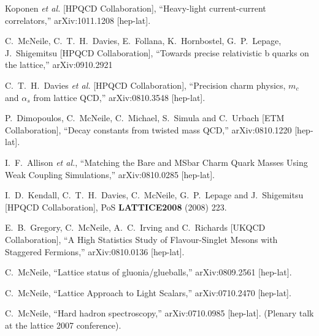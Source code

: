 \begin{thebibliography}{130}
   Koponen {\it et al.}  [HPQCD Collaboration],
  ``Heavy-light current-current correlators,''
  arXiv:1011.1208 [hep-lat].


  C.~McNeile, C.~T.~H.~Davies, E.~Follana, K.~Hornbostel,
  G.~P.~Lepage, J.~Shigemitsu [HPQCD Collaboration],
  ``Towards precise relativistic b quarks on the lattice,''
  arXiv:0910.2921

  C.~T.~H.~Davies {\it et al.}  [HPQCD Collaboration],
  ``Precision charm physics, $m_c$ and $\alpha_s$ from lattice QCD,''
  arXiv:0810.3548 [hep-lat].


  P.~Dimopoulos, C.~McNeile, C.~Michael, S.~Simula and C.~Urbach  [ETM
                  Collaboration],
  ``Decay constants from twisted mass QCD,''
  arXiv:0810.1220 [hep-lat].



  I.~F.~Allison {\it et al.},
  ``Matching the Bare and MSbar Charm Quark Masses Using Weak
  Coupling
  Simulations,''
  arXiv:0810.0285 [hep-lat].

  I.~D.~Kendall, C.~T.~H.~Davies, C.~McNeile, G.~P.~Lepage and
  J.~Shigemitsu
                  [HPQCD Collaboration],
  PoS {\bf LATTICE2008} (2008) 223.



  E.~B.~Gregory, C.~McNeile, A.~C.~Irving and C.~Richards  [UKQCD
                  Collaboration],
  ``A High Statistics Study of Flavour-Singlet Mesons with Staggered
  Fermions,''
  arXiv:0810.0136 [hep-lat].

  C.~McNeile,
  ``Lattice status of gluonia/glueballs,''
  arXiv:0809.2561 [hep-lat].


  C.~McNeile,
  ``Lattice Approach to Light Scalars,''
  arXiv:0710.2470 [hep-lat].

  C.~McNeile,
  ``Hard hadron spectroscopy,''
  arXiv:0710.0985 [hep-lat].
(Plenary talk at the lattice 2007 conference).



\end{thebibliography}
